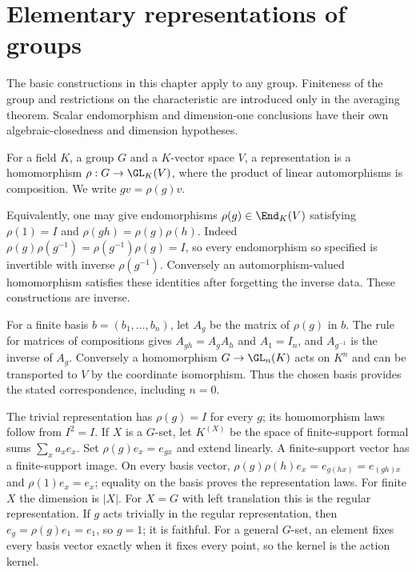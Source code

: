 \chapter{Elementary representations of groups}
\label{chap:M07.17}
The basic constructions in this chapter apply to any group. Finiteness of
the group and restrictions on the characteristic are introduced only in
the averaging theorem. Scalar endomorphism and dimension-one conclusions
have their own algebraic-closedness and dimension hypotheses.

\begin{definition}
For a field $K$, a group $G$ and a $K$-vector space $V$, a representation
is a homomorphism $\rho:G\to\GL_K(V)$, where the product of linear
automorphisms is composition. We write $gv=\rho(g)v$.
\end{definition}
Equivalently, one may give endomorphisms $\rho(g)\in\End_K(V)$
satisfying $\rho(1)=I$ and $\rho(gh)=\rho(g)\rho(h)$.
Indeed $\rho(g)\rho(g^{-1})=\rho(g^{-1})\rho(g)=I$, so every
endomorphism so specified is invertible with inverse $\rho(g^{-1})$.
Conversely an automorphism-valued homomorphism satisfies these identities
after forgetting the inverse data. These constructions are inverse.

For a finite basis $b=(b_1,\ldots,b_n)$, let $A_g$ be the matrix of
$\rho(g)$ in $b$. The rule for matrices of compositions gives
$A_{gh}=A_gA_h$ and $A_1=I_n$, and $A_{g^{-1}}$ is the inverse of
$A_g$. Conversely a homomorphism $G\to\GL_n(K)$ acts on $K^n$ and
can be transported to $V$ by the coordinate isomorphism. Thus the
chosen basis provides the stated correspondence, including $n=0$.

The trivial representation has $\rho(g)=I$ for every $g$; its
homomorphism laws follow from $I^2=I$. If $X$ is a $G$-set, let
$K^{(X)}$ be the space of finite-support formal sums $\sum_xa_xe_x$.
Set $\rho(g)e_x=e_{gx}$ and extend linearly. A finite-support vector
has a finite-support image. On every basis vector,
$\rho(g)\rho(h)e_x=e_{g(hx)}=e_{(gh)x}$ and $\rho(1)e_x=e_x$;
equality on the basis proves the representation laws. For finite $X$
the dimension is $|X|$. For $X=G$ with left translation this is the
regular representation. If $g$ acts trivially in the regular
representation, then $e_g=\rho(g)e_1=e_1$, so $g=1$; it is faithful.
For a general $G$-set, an element fixes every basis vector exactly
when it fixes every point, so the kernel is the action kernel.


